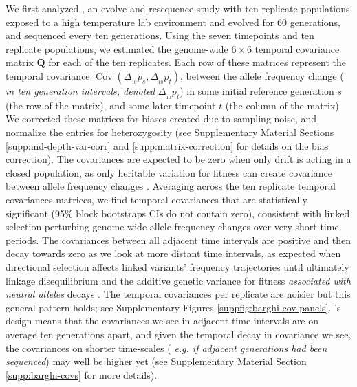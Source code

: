 \documentclass[11pt]{article}
\newcommand{\vb}[1]{{\it \color{blue} #1}}
\DeclareMathOperator{\cov}{Cov}
\begin{document}
We first analyzed \textcite{Barghi2019-qy}, an evolve-and-resequence study with
ten replicate populations exposed to a high temperature lab environment and
evolved for 60 generations, and sequenced every ten generations. Using the
seven timepoints and ten replicate populations, we estimated the genome-wide $6
\times 6$ temporal covariance matrix $\mathbf{Q}$ for each of the ten
replicates. Each row of these matrices represent the temporal covariance
$\cov(\Delta_{_{10}} p_s, \Delta_{_{10}} p_t)$, between the allele frequency
change (\vb{in ten generation intervals, denoted} $\Delta_{_{10}} p_t$) in some
initial reference generation $s$ (the row of the matrix), and some later
timepoint $t$ (the column of the matrix). We corrected these matrices for
biases created due to sampling noise, and normalize the entries for
heterozygosity (see Supplementary Material Sections
\ref{supp:ind-depth-var-corr} and \ref{supp:matrix-correction} for details on
the bias correction). The covariances are expected to be zero when only drift
is acting in a closed population, as only heritable variation for fitness can
create covariance between allele frequency changes \parencite{Buffalo2019-io}.
Averaging across the ten replicate temporal covariances matrices, we find
temporal covariances that are statistically significant (95\% block bootstraps
CIs do not contain zero), consistent with linked selection perturbing
genome-wide allele frequency changes over very short time periods. The
covariances between all adjacent time intervals are positive and then decay
towards zero as we look at more distant time intervals, as expected when
directional selection affects linked variants' frequency trajectories until
ultimately linkage disequilibrium and the additive genetic variance for fitness
\vb{associated with neutral alleles} decays \parencite{Buffalo2019-io}. The
temporal covariances per replicate are noisier but this general pattern holds;
see Supplementary Figures \ref{suppfig:barghi-cov-panels}.
\textcite{Barghi2019-qy}'s design means that the covariances we see in adjacent
time intervals are on average ten generations apart, and given the temporal
decay in covariance we see, the covariances on shorter time-scales (\vb{e.g. if
adjacent generations had been sequenced}) may well be higher yet (see
Supplementary Material Section \ref{supp:barghi-covs} for more details).

\end{document}
